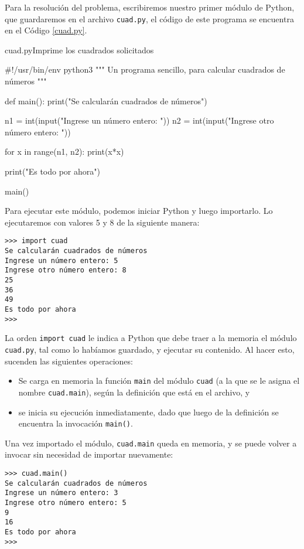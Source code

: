 \begin{solucion}
Para la resolución del problema, escribiremos nuestro primer módulo de
Python, que guardaremos en el archivo \verb!cuad.py!, el código de este
programa se encuentra en el Código \ref{cuad.py}.

\begin{codigo}{cuad.py}{Imprime los cuadrados solicitados}
\label{cuad.py}
\begin{codigo-python}
#!/usr/bin/env python3
""" Un programa sencillo, para calcular cuadrados
de números """

def main():
    print("Se calcularán cuadrados de números")

    n1 = int(input("Ingrese un número entero: "))
    n2 = int(input("Ingrese otro número entero: "))

    for x in range(n1, n2):
        print(x*x)

    print("Es todo por ahora")

main()
\end{codigo-python}
\end{codigo}

Para ejecutar este módulo, podemos iniciar Python y luego
importarlo. Lo ejecutaremos con valores 5 y 8 de la siguiente
manera:
\begin{lstlisting}[numbers=none]
>>> import cuad
Se calcularán cuadrados de números
Ingrese un número entero: 5
Ingrese otro número entero: 8
25
36
49
Es todo por ahora
>>>
\end{lstlisting}

La orden \lstinline+import cuad+ le indica a Python que debe traer a la
memoria el módulo \verb+cuad.py+, tal como lo habíamos guardado, y
ejecutar su contenido. Al hacer esto, sucenden las siguientes operaciones:

\begin{itemize}
\item Se carga en memoria la función \lstinline+main+ del módulo
\lstinline+cuad+ (a la que se le asigna el nombre \lstinline+cuad.main+),
según la definición que está en el archivo, y

\item se inicia su ejecución inmediatamente, dado que luego de la
definición se encuentra la invocación \lstinline+main()+.
\end{itemize}

Una vez importado el módulo, \lstinline+cuad.main+ queda en memoria, y
se puede volver a invocar sin necesidad de importar nuevamente:

\begin{lstlisting}[numbers=none]
>>> cuad.main()
Se calcularán cuadrados de números
Ingrese un número entero: 3
Ingrese otro número entero: 5
9
16
Es todo por ahora
>>>
\end{lstlisting}
\end{solucion}

